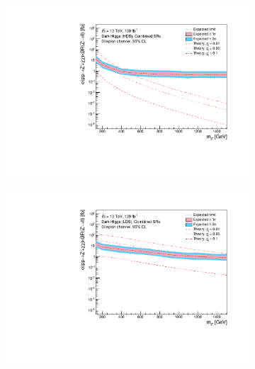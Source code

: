 \documentclass[12pt, a4paper]{book}
\begin{document}
\begin{figure}[!ht]
	\centering
	\begin{subfigure}[b]{0.49\textwidth}
      \centering
      \includegraphics[width=1\textwidth]{Limits/Model_independent/DH_HDS/mass_exclusion_comb.pdf}
   \end{subfigure}
   \hfill
   \begin{subfigure}[b]{0.49\textwidth}
      \centering
      \includegraphics[width=1\textwidth]{Limits/Model_independent/DH_LDS/mass_exclusion_comb.pdf}
   \end{subfigure}
   \hfill
   \begin{subfigure}[b]{0.49\textwidth}
      \centering

\end{subfigure}
\end{figure}
\end{document}
